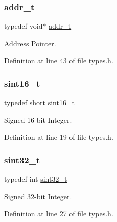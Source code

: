 \subsubsection{\texorpdfstring{addr\+\_\+t}{addr\_t}}
{\footnotesize\ttfamily typedef void$\ast$ \hyperlink{a00032_aa0015d6dd7c46f7b7a2ff7b5bf407f5c_aa0015d6dd7c46f7b7a2ff7b5bf407f5c}{addr\+\_\+t}}



Address Pointer. 



Definition at line 43 of file types.\+h.

\mbox{\label{a00032_a5881659ed80e940350d12831204375cd_a5881659ed80e940350d12831204375cd}} 
\subsubsection{\texorpdfstring{sint16\+\_\+t}{sint16\_t}}
{\footnotesize\ttfamily typedef short \hyperlink{a00032_a5881659ed80e940350d12831204375cd_a5881659ed80e940350d12831204375cd}{sint16\+\_\+t}}



Signed 16-\/bit Integer. 



Definition at line 19 of file types.\+h.

\mbox{\label{a00032_ad838970452fe561cb8e0550cac5336be_ad838970452fe561cb8e0550cac5336be}} 
\subsubsection{\texorpdfstring{sint32\+\_\+t}{sint32\_t}}
{\footnotesize\ttfamily typedef int \hyperlink{a00032_ad838970452fe561cb8e0550cac5336be_ad838970452fe561cb8e0550cac5336be}{sint32\+\_\+t}}



Signed 32-\/bit Integer. 



Definition at line 27 of file types.\+h.

\mbox{\label{a00032_a04761b9e7480e1e48b0d392da17fd5d4_a04761b9e7480e1e48b0d392da17fd5d4}} 
